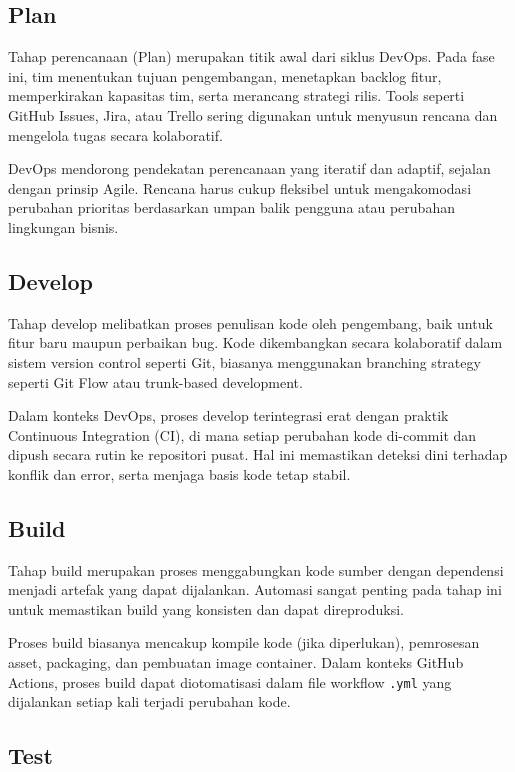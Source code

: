 \subsection{Plan}

Tahap perencanaan (Plan) merupakan titik awal dari siklus DevOps. Pada fase ini, tim menentukan tujuan pengembangan, menetapkan backlog fitur, memperkirakan kapasitas tim, serta merancang strategi rilis. Tools seperti GitHub Issues, Jira, atau Trello sering digunakan untuk menyusun rencana dan mengelola tugas secara kolaboratif.

DevOps mendorong pendekatan perencanaan yang iteratif dan adaptif, sejalan dengan prinsip Agile. Rencana harus cukup fleksibel untuk mengakomodasi perubahan prioritas berdasarkan umpan balik pengguna atau perubahan lingkungan bisnis.

\subsection{Develop}

Tahap develop melibatkan proses penulisan kode oleh pengembang, baik untuk fitur baru maupun perbaikan bug. Kode dikembangkan secara kolaboratif dalam sistem version control seperti Git, biasanya menggunakan branching strategy seperti Git Flow atau trunk-based development.

Dalam konteks DevOps, proses develop terintegrasi erat dengan praktik Continuous Integration (CI), di mana setiap perubahan kode di-commit dan dipush secara rutin ke repositori pusat. Hal ini memastikan deteksi dini terhadap konflik dan error, serta menjaga basis kode tetap stabil.

\subsection{Build}

Tahap build merupakan proses menggabungkan kode sumber dengan dependensi menjadi artefak yang dapat dijalankan. Automasi sangat penting pada tahap ini untuk memastikan build yang konsisten dan dapat direproduksi.

Proses build biasanya mencakup kompile kode (jika diperlukan), pemrosesan asset, packaging, dan pembuatan image container. Dalam konteks GitHub Actions, proses build dapat diotomatisasi dalam file workflow \texttt{.yml} yang dijalankan setiap kali terjadi perubahan kode.

\subsection{Test}

